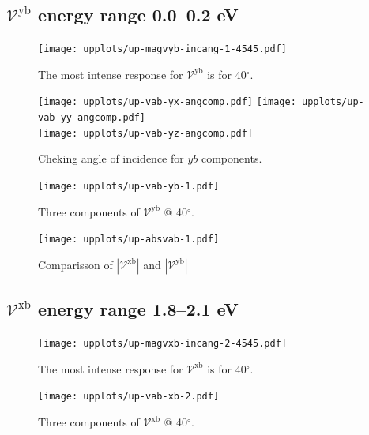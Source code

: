 \documentclass{article}
\let\Oldsubsection\subsection
\renewcommand{\subsection}{\FloatBarrier\Oldsubsection}
\begin{document}

\subsection{$\mathcal{V}^{\mathrm{yb}}$ energy range 0.0--0.2 eV }
\begin{figure}[h]
    \centering
    \texttt{[image: upplots/up-magvyb-incang-1-4545.pdf]}
    \caption{The most intense response for $\mathcal{V}^{\mathrm{yb}} $ is for 
    40$^{\circ}$.}
    \label{fig:up-magvybincang1}
\end{figure}
\begin{figure}[ht]
    \centering
    \texttt{[image: upplots/up-vab-yx-angcomp.pdf]}
    \texttt{[image: upplots/up-vab-yy-angcomp.pdf]}\\
    \texttt{[image: upplots/up-vab-yz-angcomp.pdf]}
    \caption{Cheking angle of incidence for $yb$ components.}
    \label{fig:up-ybangcomp}
\end{figure}
\begin{figure}[ht]
    \centering
    \texttt{[image: upplots/up-vab-yb-1.pdf]}
    \caption{Three components of $\mathcal{V}^{\mathrm{yb}} $ @ 40$^{\circ}$.}
    \label{fig:up-vyb1}
\end{figure}

\begin{figure}[h]
    \centering
    \texttt{[image: upplots/up-absvab-1.pdf]}
    \caption{Comparisson of $|\mathcal{V}^{\mathrm{xb}}|$ and $|\mathcal{V}^{\mathrm{yb}}|$}    
    \label{fig:up-xbybcomp-1}
\end{figure}


\subsection{$\mathcal{V}^{\mathrm{xb}}$ energy range 1.8--2.1 eV }


\begin{figure}[h]
    \centering
    \texttt{[image: upplots/up-magvxb-incang-2-4545.pdf]}
    \caption{The most intense response for $\mathcal{V}^{\mathrm{xb}} $ is for 
    40$^{\circ}$.}
    \label{fig:up-magxbincang2}
\end{figure}
\begin{figure}[h]
    \centering
    \texttt{[image: upplots/up-vab-xb-2.pdf]}
    \caption{Three components of $\mathcal{V}^{\mathrm{xb}} $ @ 40$^{\circ}$.}
    \label{fig:up-vxb2}
\end{figure}
\end{document}
